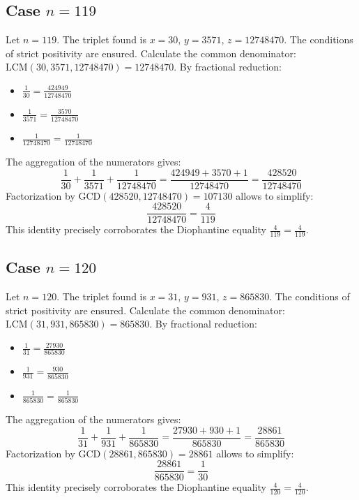 \documentclass[11pt,a4paper]{article}
\begin{document}
\subsection{Case $n = 119$}
Let $n = 119$. The triplet found is $x = 30$, $y = 3571$, $z = 12748470$.
The conditions of strict positivity are ensured.
Calculate the common denominator: $\text{LCM}(30, 3571, 12748470) = 12748470$.
By fractional reduction:
\begin{itemize}
    \item $\frac{1}{30} = \frac{424949}{12748470}$
    \item $\frac{1}{3571} = \frac{3570}{12748470}$
    \item $\frac{1}{12748470} = \frac{1}{12748470}$
\end{itemize}
The aggregation of the numerators gives:
$$ \frac{1}{30} + \frac{1}{3571} + \frac{1}{12748470} = \frac{424949 + 3570 + 1}{12748470} = \frac{428520}{12748470} $$
Factorization by $\text{GCD}(428520, 12748470) = 107130$ allows to simplify:
$$ \frac{428520}{12748470} = \frac{4}{119} $$
This identity precisely corroborates the Diophantine equality $\frac{4}{119} = \frac{4}{119}$.

\subsection{Case $n = 120$}
Let $n = 120$. The triplet found is $x = 31$, $y = 931$, $z = 865830$.
The conditions of strict positivity are ensured.
Calculate the common denominator: $\text{LCM}(31, 931, 865830) = 865830$.
By fractional reduction:
\begin{itemize}
    \item $\frac{1}{31} = \frac{27930}{865830}$
    \item $\frac{1}{931} = \frac{930}{865830}$
    \item $\frac{1}{865830} = \frac{1}{865830}$
\end{itemize}
The aggregation of the numerators gives:
$$ \frac{1}{31} + \frac{1}{931} + \frac{1}{865830} = \frac{27930 + 930 + 1}{865830} = \frac{28861}{865830} $$
Factorization by $\text{GCD}(28861, 865830) = 28861$ allows to simplify:
$$ \frac{28861}{865830} = \frac{1}{30} $$
This identity precisely corroborates the Diophantine equality $\frac{4}{120} = \frac{4}{120}$.
\end{document}
